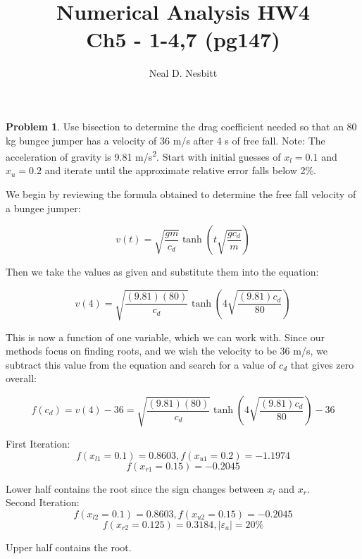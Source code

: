 \documentclass{article}
\title{Numerical Analysis HW4\\
Ch5 - 1-4,7 (pg147)}
\author{Neal D. Nesbitt}
\begin{document}
\maketitle

\theoremstyle{definition}
\newtheorem{problem}{Problem}


\begin{problem}

	Use bisection to determine the drag coefficient needed so that an 80 kg bungee jumper has a velocity of 36 m/s after 4 s of free fall. Note: The acceleration of gravity is 9.81 m/s\textsuperscript{2}. Start with initial guesses of $x_{l}=0.1$ and $x_{u}=0.2$ and iterate until the approximate relative error falls below 2\%. 
	
\end{problem}

We begin by reviewing the formula obtained to determine the free fall velocity of a bungee jumper:

\[ v(t) = \sqrt{\frac{gm}{c_{d}}} \tanh\left( t \sqrt{\frac{gc_{d}}{m}} \right) \]

Then we take the values as given and substitute them into the equation:

\[ v(4) = \sqrt{\frac{(9.81)(80)}{c_{d}}} \tanh\left( 4 \sqrt{\frac{(9.81)c_{d}}{80}} \right) \]

This is now a function of one variable, which we can work with. Since our methods focus on finding roots, and we wish the velocity to be 36 m/s, we subtract this value from the equation and search for a value of $c_{d}$ that gives zero overall:

\[ f(c_{d}) = v(4) - 36 = \sqrt{\frac{(9.81)(80)}{c_{d}}} \tanh\left( 4 \sqrt{\frac{(9.81)c_{d}}{80}} \right) - 36 \]

First Iteration:
\[ f(x_{l1}=0.1) = 0.8603, f(x_{u1}=0.2) = -1.1974 \]
\[ f(x_{r1}=0.15) = -0.2045 \]

Lower half contains the root since the sign changes between $x_{l}$ and $x_{r}$.\\

Second Iteration:
\[ f(x_{l2}=0.1) = 0.8603, f(x_{u2}=0.15) = -0.2045 \]
\[ f(x_{r2}=0.125) = 0.3184, \left| \varepsilon_{a} \right| = 20\% \]

Upper half contains the root.\\
\end{document}
